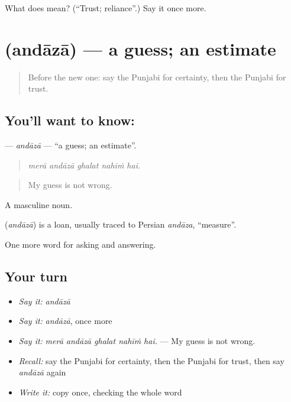\begin{tcolorbox}[breakable,colback=teal!4,colframe=teal!35!black,title={Before you move on}]
What does  mean? (\textquotedblleft{}Trust; reliance\textquotedblright{}.) Say it once more.
\end{tcolorbox}
\section[\texorpdfstring{\pa{ਅੰਦਾਜ਼ਾ} (andāzā)}{ਅੰਦਾਜ਼ਾ (andāzā)}]{ (andāzā) — a guess; an estimate}

\label{lesson:PA-C341-andaza}



\begin{quote}
Before the new one: say the Punjabi for certainty, then the Punjabi for trust.
\end{quote}

\subsection*{You'll want to know: }
\textbf{} — \emph{andāzā} — \textquotedblleft{}a guess; an estimate\textquotedblright{}.

\begin{quote}
    
\end{quote}

\begin{quote}
\emph{merā andāzā ghalat nahīṁ hai.}
\end{quote}

\begin{quote}
My guess is not wrong.
\end{quote}

A masculine noun.

\begin{cousinweb}
\textbf{} (\emph{andāzā}) is a loan, usually traced to Persian \emph{andāza}, \textquotedblleft{}measure\textquotedblright{}.
\end{cousinweb}

\begin{grammarlens}[title={What you've built}]
One more word for asking and answering.
\end{grammarlens}

\subsection*{Your turn}
\begin{itemize}
\raggedright
  \item \emph{Say it:} \emph{andāzā}
  \item \emph{Say it:} \emph{andāzā}, once more
  \item \emph{Say it:} \emph{merā andāzā ghalat nahīṁ hai.} — My guess is not wrong.
  \item \emph{Recall:} say the Punjabi for certainty, then the Punjabi for trust, then say \emph{andāzā} again
  \item \emph{Write it:} copy \textbf{} once, checking the whole word
\end{itemize}

